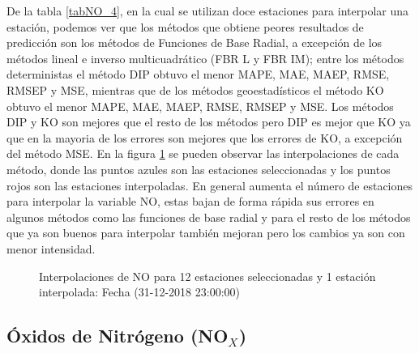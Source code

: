 De la tabla \ref{tabNO_4}, en la cual se utilizan doce estaciones para interpolar una estación, podemos ver que los métodos que obtiene peores resultados de predicción son los métodos de Funciones de Base Radial, a excepción de los métodos lineal e inverso multicuadrático (FBR L y FBR IM); entre los métodos deterministas el método DIP obtuvo el menor MAPE, MAE, MAEP, RMSE, RMSEP y MSE, mientras que de los métodos geoestadísticos el método KO obtuvo el menor MAPE, MAE, MAEP, RMSE, RMSEP y MSE. Los métodos DIP y KO son mejores que el resto de los métodos pero DIP es mejor que KO ya que en la mayoria de los errores son mejores que los errores de KO, a excepción del método MSE. En la figura \ref{NOfigure4} se pueden observar las interpolaciones de cada método, donde las puntos azules son las estaciones seleccionadas y los puntos rojos son las estaciones interpoladas. En general aumenta el número de estaciones para interpolar la variable NO, estas bajan de forma rápida sus errores en algunos métodos como las funciones de base radial y para el resto de los métodos que ya son buenos para interpolar también mejoran pero los cambios ya son con menor intensidad.


\begin{figure}[H]
\centering
{}
\subfigure[KO] {\texttt{[image: ./ok\_12\_1\_26302]}}
\subfigure[KU] {\texttt{[image: ./uk\_12\_1\_26302]}}
\caption{Interpolaciones de NO para 12 estaciones seleccionadas y 1 estación interpolada: Fecha (31-12-2018 23:00:00)}
\label{NOfigure4}
\end{figure}







\subsection{Óxidos de Nitrógeno (NO$_{X}$)}

